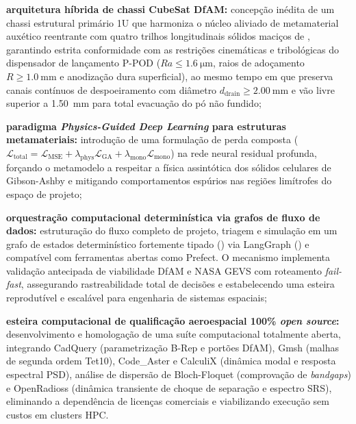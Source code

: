 \begin{alineas}
  \item \textbf{arquitetura híbrida de chassi CubeSat DfAM:} concepção inédita de um chassi estrutural primário 1U que harmoniza o núcleo aliviado de metamaterial auxético reentrante com quatro trilhos longitudinais sólidos maciços de \rail{}, garantindo estrita conformidade com as restrições cinemáticas e tribológicas do dispensador de lançamento P-POD ($Ra \le \SI{1.6}{\micro\metre}$, raios de adoçamento $R \ge \SI{1.0}{\milli\metre}$ e anodização dura superficial), ao mesmo tempo em que preserva canais contínuos de despoeiramento com diâmetro $d_{\text{drain}} \ge \SI{2.00}{\milli\metre}$ e vão livre superior a \SI{1.50}{\milli\metre} para total evacuação do pó não fundido;
  
  \item \textbf{paradigma \textit{Physics-Guided Deep Learning} para estruturas metamateriais:} introdução de uma formulação de perda composta ($\mathcal{L}_{\text{total}} = \mathcal{L}_{\text{MSE}} + \lambda_{\text{phys}}\mathcal{L}_{\text{GA}} + \lambda_{\text{mono}}\mathcal{L}_{\text{mono}}$) na rede neural residual profunda, forçando o metamodelo a respeitar a física assintótica dos sólidos celulares de Gibson-Ashby e mitigando comportamentos espúrios nas regiões limítrofes do espaço de projeto;
  
  \item \textbf{orquestração computacional determinística via grafos de fluxo de dados:} estruturação do fluxo completo de projeto, triagem e simulação em um grafo de estados determinístico fortemente tipado () via LangGraph () e compatível com ferramentas abertas como Prefect. O mecanismo implementa validação antecipada de viabilidade DfAM e NASA GEVS com roteamento \textit{fail-fast}, assegurando rastreabilidade total de decisões e estabelecendo uma esteira reprodutível e escalável para engenharia de sistemas espaciais;
  
  \item \textbf{esteira computacional de qualificação aeroespacial 100\% \textit{open source}:} desenvolvimento e homologação de uma suíte computacional totalmente aberta, integrando CadQuery (parametrização B-Rep e portões DfAM), Gmsh (malhas de segunda ordem Tet10), Code\_Aster e CalculiX (dinâmica modal e resposta espectral PSD), análise de dispersão de Bloch-Floquet (comprovação de \textit{bandgaps}) e OpenRadioss (dinâmica transiente de choque de separação e espectro SRS), eliminando a dependência de licenças comerciais e viabilizando execução sem custos em clusters HPC.
\end{alineas}

